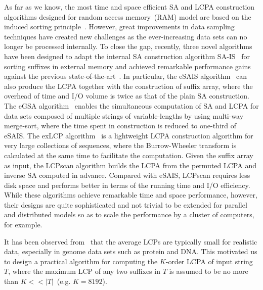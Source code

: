 \documentclass{llncs}
\begin{document}
As far as we know, the most time and space efficient SA and LCPA construction algorithms designed for random access memory~(RAM) model are based on the induced sorting principle~\cite{nong2011,Fischer11}. However, great improvements in data sampling techniques have created new challenges as the ever-increasing data sets can no longer be processed internally. To close the gap, recently, three novel algorithms~\cite{Nong15, Bingmann12, Nong14} have been designed to adapt the internal SA construction algorithm SA-IS~\cite{nong2011} for sorting suffixes in external memory and achieved remarkable performance gains against the previous state-of-the-art~\cite{Dementiev08}. In particular, the eSAIS algorithm~\cite{Bingmann12} can also produce the LCPA together with the construction of suffix array, where the overhead of time and I/O volume is twice as that of the plain SA construction. The eGSA algorithm~\cite{Felipe2013} enables the simultaneous computation of SA and LCPA for data sets composed of multiple strings of variable-lengths by using multi-way merge-sort, where the time spent in construction is reduced to one-third of eSAIS. The exLCP algorithm~\cite{Markus2012} is a lightweight LCPA construction algorithm for very large collections of sequences, where the Burrow-Wheeler transform is calculated at the same time to facilitate the computation. Given the suffix array as input, the LCPscan algorithm \cite{Juha2014} builds the LCPA from the permuted LCPA and inverse SA computed in advance. Compared with eSAIS, LCPscan requires less disk space and performs better in terms of the running time and I/O efficiency. While these algorithms achieve remarkable time and space performance, however, their designs are quite sophisticated and not trivial to be extended for parallel and distributed models so as to scale the performance by a cluster of computers, for example.

It has been observed from~\cite{Felipe2013} that the average LCPs are typically small for realistic data, especially in genome data sets such as protein and DNA. This motivated us to design a practical algorithm for computing the $K$-order LCPA of input string $T$, where the maximum LCP of any two suffixes in $T$ is assumed to be no more than $K<<|T|$~(e.g. $K=8192$).
\end{document}
